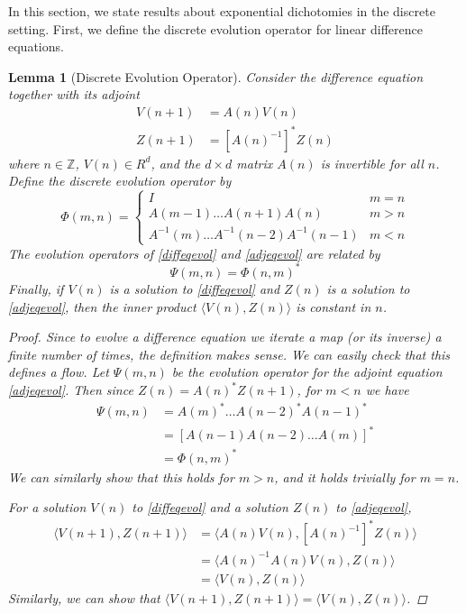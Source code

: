 \documentclass[12pt]{article}
\def\Z{{\mathbb Z}}
\newtheorem{lemma}{Lemma}
\begin{document}
In this section, we state results about exponential dichotomies in the discrete setting. First, we define the discrete evolution operator for linear difference equations.

\begin{lemma}[Discrete Evolution Operator]\label{evolop}
Consider the difference equation together with its adjoint
\begin{align}
V(n+1) &= A(n) V(n) \label{diffeqevol} \\
Z(n+1) &= [A(n)^{-1}]^* Z(n) \label{adjeqevol}
\end{align}
where $n \in \Z$, $V(n) \in R^d$, and the $d \times d$ matrix $A(n)$ is invertible for all $n$. Define the discrete evolution operator by
\begin{equation}\label{evol}
\Phi(m, n) = 
\begin{cases}
I & m = n \\
A(m-1) \dots A(n+1) A(n) & m > n \\
A^{-1}(m) \dots A^{-1}(n-2) A^{-1}(n-1) & m < n
\end{cases}
\end{equation}
The evolution operators of \eqref{diffeqevol} and \eqref{adjeqevol} are related by
\begin{equation}\label{adjevol}
\Psi(m, n) = \Phi(n, m)^*
\end{equation}
Finally, if $V(n)$ is a solution to \eqref{diffeqevol} and $Z(n)$ is a solution to \eqref{adjeqevol}, then the inner product $\langle V(n), Z(n) \rangle$ is constant in $n$.

\begin{proof}
Since to evolve a difference equation we iterate a map (or its inverse) a finite number of times, the definition makes sense. We can easily check that this defines a flow. Let $\Psi(m, n)$ be the evolution operator for the adjoint equation \eqref{adjeqevol}. Then since $Z(n) = A(n)^* Z(n+1)$, for $m < n$ we have
\begin{align*}
\Psi(m, n) &= A(m)^* \dots A(n-2)^* A(n-1)^* \\
&= [A(n-1) A(n-2) \dots A(m)]^* \\
&= \Phi(n, m)^*
\end{align*}
We can similarly show that this holds for $m > n$, and it holds trivially for $m = n$.

For a solution $V(n)$ to \eqref{diffeqevol} and a solution $Z(n)$ to \eqref{adjeqevol},
\begin{align*}
\langle V(n+1), Z(n+1) \rangle &= 
\langle A(n) V(n), [A(n)^{-1}]^* Z(n) \rangle \\
&= \langle A(n)^{-1} A(n) V(n), Z(n) \rangle \\
&= \langle V(n), Z(n) \rangle
\end{align*}
Similarly, we can show that $\langle V(n+1), Z(n+1) \rangle = \langle V(n), Z(n) \rangle$.
\end{proof}
\end{lemma}
\end{document}
